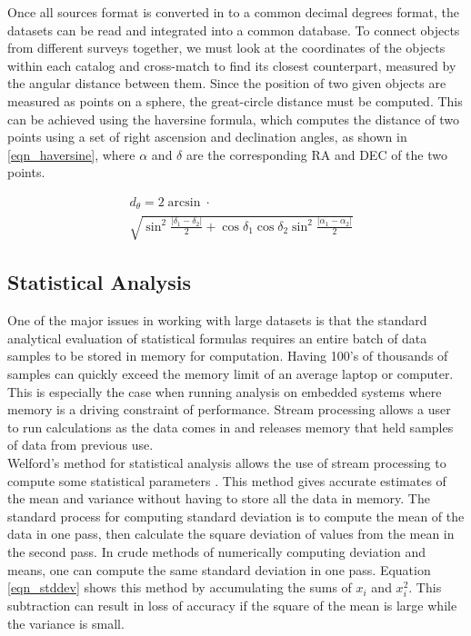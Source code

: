 \documentclass[11pt,sigconf]{acmart}
\begin{document}
Once all sources format is converted in to a common decimal degrees format, the 
datasets can be read and integrated into a common database. To connect objects 
from different surveys together, we must look at the coordinates of the
objects within each catalog and cross-match to find its closest counterpart, 
measured by the angular distance between them. Since the position of two given 
objects are measured as points on a sphere, the great-circle distance must be 
computed. This can be achieved using the haversine formula, which computes the 
distance of two points using a set of right ascension and declination angles, 
as shown in \ref{eqn_haversine}, where $\alpha$ and $\delta$ are the corresponding
RA and DEC of the two points.

\begin{equation} \label{eqn_haversine}
  \begin{split}
   & d_{\theta} = 2 \arcsin \cdot \\
   & {\sqrt{\sin^2\frac{\left| \delta_1 - \delta_2 \right|}{2} + \cos{\delta_1}\cos{\delta_2}\sin^2\frac{\left| \alpha_1 - \alpha_2 \right|}{2}}}  
  \end{split}
\end{equation}


\subsection{Statistical Analysis}
One of the major issues in working with large datasets is that the standard analytical
evaluation of statistical formulas requires an entire batch of data samples to
be stored in memory for computation. Having 100's of thousands of samples can
quickly exceed the memory limit of an average laptop or computer. This is especially
the case when running analysis on embedded systems where memory is a driving constraint
of performance. Stream processing allows a user to run calculations as the data comes in
and releases memory that held samples of data from previous use.
\\
Welford's method for statistical analysis allows the use of stream processing to
compute some statistical parameters \cite{welford}. This method gives accurate estimates of the 
mean and variance without having to store all the data in memory. The standard process for computing
standard deviation is to compute the mean of the data in one pass, then calculate the square
deviation of values from the mean in the second pass. In crude methods of numerically computing
deviation and means, one can compute the same standard deviation in one pass. Equation \ref{eqn_stddev} shows
this method by accumulating the sums of $x_i$ and $x_{i}^{2}$. This subtraction can result in 
loss of accuracy if the square of the mean is large while the variance is small.
\end{document}
